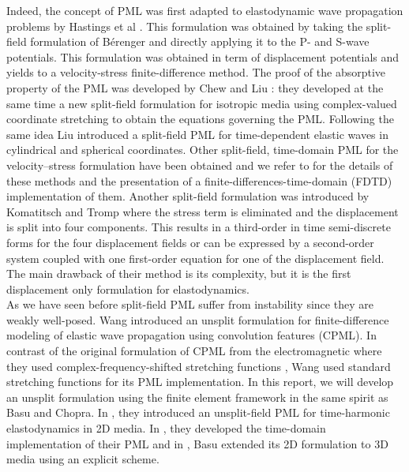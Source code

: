 Indeed, the concept of PML was first adapted to elastodynamic wave propagation problems by Hastings et al \cite{Hastings}. This formulation was obtained by taking the split-field formulation of Bérenger and directly applying it to the P- and S-wave potentials. This formulation was obtained in term of displacement potentials and yields to a velocity-stress finite-difference method. The proof of the absorptive property of the PML was developed by Chew and Liu \cite{ChewLiu}: they developed at the same time a new split-field formulation for isotropic media using complex-valued coordinate stretching to obtain the equations governing the PML. Following the same idea Liu \cite{Liu} introduced a split-field PML for time-dependent elastic waves in cylindrical and spherical coordinates. Other split-field, time-domain PML for the velocity–stress formulation have been obtained and we refer to \cite{Zhang,Collino,Becache2} for the details of these methods and the presentation of a finite-differences-time-domain (FDTD) implementation of them. Another split-field formulation was introduced by Komatitsch and Tromp \cite{Komatitsch} where the stress term is eliminated and the displacement is split into four components. This results in a third-order in time semi-discrete forms for the four displacement fields or can be expressed by a second-order system coupled with one first-order equation for one of the displacement field. The main drawback of their method is its complexity, but it is the first displacement only formulation for elastodynamics.\\
As we have seen before split-field PML suffer from instability since they are weakly well-posed. Wang \cite{Wang} introduced an unsplit formulation for finite-difference modeling of elastic wave propagation using convolution features (CPML). In contrast of the original formulation of CPML from the electromagnetic where they used complex-frequency-shifted stretching functions \cite{Teixeira, Roden}, Wang used standard stretching functions for its PML implementation.  In this report, we will develop an unsplit formulation using the finite element framework in the same spirit as Basu and Chopra. In \cite{Basu2003}, they introduced an unsplit-field PML for time-harmonic elastodynamics in 2D media. In \cite{Basu2004}, they developed the time-domain implementation of their PML and in \cite{Basu2008}, Basu extended its 2D formulation to 3D media using an explicit scheme. \\ 
